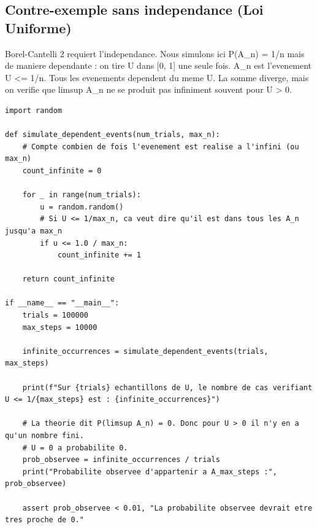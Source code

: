 \documentclass[11pt,a4paper]{article}
\begin{document}
\subsection*{Contre-exemple sans independance (Loi Uniforme)}
Borel-Cantelli 2 requiert l'independance.
Nous simulons ici P(A\_n) = 1/n mais de maniere dependante : on tire U dans [0, 1] une seule fois.
A\_n est l'evenement {U <= 1/n}. Tous les evenements dependent du meme U.
La somme diverge, mais on verifie que limsup A\_n ne se produit pas infiniment souvent pour U > 0.

\begin{lstlisting}
import random

def simulate_dependent_events(num_trials, max_n):
    # Compte combien de fois l'evenement est realise a l'infini (ou max_n)
    count_infinite = 0

    for _ in range(num_trials):
        u = random.random()
        # Si U <= 1/max_n, ca veut dire qu'il est dans tous les A_n jusqu'a max_n
        if u <= 1.0 / max_n:
            count_infinite += 1

    return count_infinite

if __name__ == "__main__":
    trials = 100000
    max_steps = 10000

    infinite_occurrences = simulate_dependent_events(trials, max_steps)

    print(f"Sur {trials} echantillons de U, le nombre de cas verifiant U <= 1/{max_steps} est : {infinite_occurrences}")

    # La theorie dit P(limsup A_n) = 0. Donc pour U > 0 il n'y en a qu'un nombre fini.
    # U = 0 a probabilite 0.
    prob_observee = infinite_occurrences / trials
    print("Probabilite observee d'appartenir a A_max_steps :", prob_observee)

    assert prob_observee < 0.01, "La probabilite observee devrait etre tres proche de 0."
\end{lstlisting}
\end{document}
